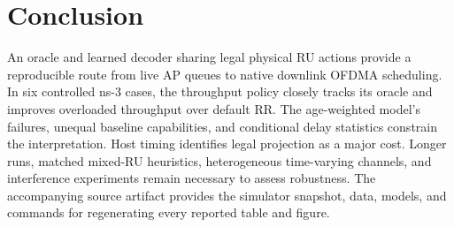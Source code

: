 \documentclass[10pt,journal,onecolumn]{IEEEtran}
\begin{document}
\section{Conclusion}
An oracle and learned decoder sharing legal physical RU actions provide a
reproducible route from live AP queues to native downlink OFDMA scheduling.
In six controlled ns-3 cases, the throughput policy closely tracks its
oracle and improves overloaded throughput over default RR. The age-weighted
model's failures, unequal baseline capabilities, and conditional delay
statistics constrain the interpretation. Host timing identifies legal
projection as a major cost. Longer runs, matched mixed-RU heuristics,
heterogeneous time-varying channels, and interference experiments remain
necessary to assess robustness. The accompanying source artifact provides
the simulator snapshot, data, models, and commands for regenerating every
reported table and figure.



\end{document}
